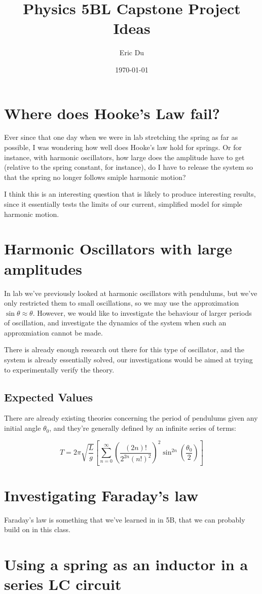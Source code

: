 \documentclass{article}
\title{Physics 5BL Capstone Project Ideas}
\author{Eric Du}
\date{\today}
\theoremstyle{definition}
\numberwithin{equation}{section}
\numberwithin{definition}{section}
\begin{document}
\maketitle

\section{Where does Hooke's Law fail?}

Ever since that one day when we were in lab stretching the spring as far as possible, I was wondering how well does Hooke's law hold for springs. Or for instance, with harmonic oscillators, how large does the amplitude have to get (relative to the spring constant, for instance), do I have to release the system so that the spring no longer follows smiple harmonic motion? 

I think this is an interesting question that is likely to produce interesting results, since it essentially tests the limits of our current, simplified model for simple harmonic motion.

\section{Harmonic Oscillators with large amplitudes}

In lab we've previously looked at harmonic oscillators with pendulums, but we've only restricted them to small oscillations, so we may use the approximation $\sin \theta \approx \theta$. However, we would like to investigate the behaviour of larger periods of oscillation, and investigate the dynamics of the system when such an approxmiation cannot be made.

There is already enough research out there for this type of oscillator, and the system is already essentially solved, our investigations would be aimed at trying to experimentally verify the theory.

\subsection*{Expected Values}

There are already existing theories concerning the period of pendulums given any initial angle $\theta_0$, and they're generally defined by an infinite series of terms: 

\[ T = 2\pi \sqrt{\frac{L}{g}}\left[\sum_{n = 0}^\infty \left(\frac{(2n)!}{2^{2n}(n!)^2}\right)^2 \sin^{2n}\left(\frac{\theta_0}{2}\right)\right]\]

\section{Investigating Faraday's law}

Faraday's law is something that we've learned in in 5B, that we can probably build on in this class. 


\section{Using a spring as an inductor in a series LC circuit}
\end{document}

